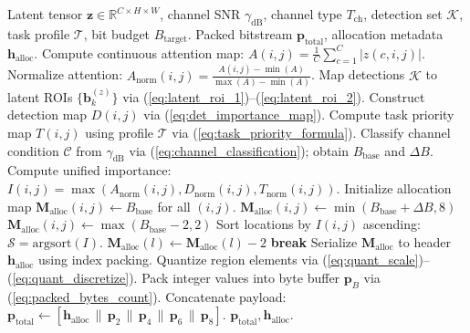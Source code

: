 \documentclass[journal,twocolumn]{IEEEtran}
\begin{document}
\begin{algorithm}[t]
\caption{Channel-Aware Adaptive Bit Allocation and Quantization}
\label{alg:adaptive_quantization}
\begin{algorithmic}[1]
\REQUIRE Latent tensor $\mathbf{z} \in \mathbb{R}^{C \times H \times W}$, channel SNR $\gamma_{\text{dB}}$, channel type $T_{\text{ch}}$, detection set $\mathcal{K}$, task profile $\mathcal{T}$, bit budget $B_{\text{target}}$.
\ENSURE Packed bitstream $\mathbf{p}_{\text{total}}$, allocation metadata $\mathbf{h}_{\text{alloc}}$.
\STATE Compute continuous attention map: $A(i,j) = \frac{1}{C}\sum_{c=1}^C |z(c,i,j)|$.
\STATE Normalize attention: $A_{\text{norm}}(i,j) = \frac{A(i,j) - \min(A)}{\max(A) - \min(A)}$.
\STATE Map detections $\mathcal{K}$ to latent ROIs $\{\mathbf{b}_k^{(z)}\}$ via (\ref{eq:latent_roi_1})--(\ref{eq:latent_roi_2}).
\STATE Construct detection map $D(i,j)$ via (\ref{eq:det_importance_map}).
\STATE Compute task priority map $T(i,j)$ using profile $\mathcal{T}$ via (\ref{eq:task_priority_formula}).
\STATE Classify channel condition $\mathcal{C}$ from $\gamma_{\text{dB}}$ via (\ref{eq:channel_classification}); obtain $B_{\text{base}}$ and $\Delta B$.
\STATE Compute unified importance: $I(i,j) = \max(A_{\text{norm}}(i,j), D_{\text{norm}}(i,j), T_{\text{norm}}(i,j))$.
\STATE Initialize allocation map $\mathbf{M}_{\text{alloc}}(i,j) \leftarrow B_{\text{base}}$ for all $(i,j)$.
        \STATE $\mathbf{M}_{\text{alloc}}(i,j) \leftarrow \min(B_{\text{base}} + \Delta B, 8)$
    \ELSE
        \STATE $\mathbf{M}_{\text{alloc}}(i,j) \leftarrow \max(B_{\text{base}} - 2, 2)$
    \ENDIF
\ENDFOR
{}
    \STATE Sort locations by $I(i,j)$ ascending: $\mathcal{S} = \text{argsort}(I)$.
            \STATE $\mathbf{M}_{\text{alloc}}(l) \leftarrow \mathbf{M}_{\text{alloc}}(l) - 2$
                \STATE \textbf{break}
            \ENDIF
        \ENDIF
    \ENDFOR
\ENDIF
\STATE Serialize $\mathbf{M}_{\text{alloc}}$ to header $\mathbf{h}_{\text{alloc}}$ using index packing.
    \STATE Quantize region elements via (\ref{eq:quant_scale})--(\ref{eq:quant_discretize}).
    \STATE Pack integer values into byte buffer $\mathbf{p}_B$ via (\ref{eq:packed_bytes_count}).
\ENDFOR
\STATE Concatenate payload: $\mathbf{p}_{\text{total}} \leftarrow [\mathbf{h}_{\text{alloc}} \,\|\, \mathbf{p}_2 \,\|\, \mathbf{p}_4 \,\|\, \mathbf{p}_6 \,\|\, \mathbf{p}_8]$.
\RETURN $\mathbf{p}_{\text{total}}, \mathbf{h}_{\text{alloc}}$.
\end{algorithmic}
\end{algorithm}
\end{document}

